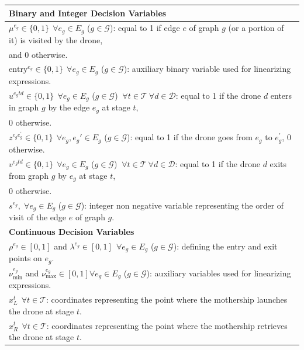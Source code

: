 \begin{table}[h!]
\scriptsize
\centering
\begin{tabular}{|l|}
\hline 
\textbf{Binary and Integer Decision Variables}\\
\hline
$\mu^{e_g} \in \{0,1\} \:\: \forall e_g \in E_g$ ($g \in \mathcal{G}$): equal to 1 if edge $e$ of graph $g$ (or a portion of it) is visited by the drone,\\ \hspace*{1cm} and  0 otherwise.\\
$\text{entry}^{e_g} \in \{0,1\} \:\: \forall e_g \in E_g$ ($g \in \mathcal{G}$): auxiliary binary variable used for linearizing expressions.\\
$u^{e_{g}td} \in \{0,1\} \:\: \forall e_g \in E_g$ ($g \in \mathcal{G}$) $\: \forall t \in \mathcal T \: \forall d \in \mathcal D$: equal to 1 if the drone $d$ enters in graph $g$ by the edge $e_g$ at stage $t$,\\ \hspace*{1cm} 0 otherwise.\\
$z^{e_{g}e^{'}_{g}} \in \{0,1\} \:\: \forall e_g, e_g' \in E_g$ ($g \in \mathcal{G}$): equal to 1 if the drone goes from $e_g$ to $e^{'}_{g}$, 0 otherwise.\\
$v^{e_{g}td} \in \{0,1\} \:\: \forall e_g \in E_g$ ($g \in \mathcal{G}$) $\: \forall t \in\mathcal T \: \forall d \in \mathcal D$: equal to 1 if the drone $d$ exits from graph $g$ by $e_g$ at stage $t$,\\ \hspace*{1cm} 0 otherwise.\\
$s^{e_g},\; \forall e_g \in E_g$ ($g \in \mathcal{G}$): integer non negative variable representing the order of visit of the edge $e$ of graph $g$.\\
\hline
\textbf{Continuous Decision Variables}\\
\hline
$\rho^{e_g} \in [0,1]$ and $\lambda^{e_g} \in [0,1] \:\: \forall e_g \in E_g$ ($g \in \mathcal{G}$): defining the entry and exit points on $e_g$.\\
$\nu_\text{min}^{e_g}$ and $\nu_\text{max}^{e_g} \in [0,1] \forall e_g \in E_g$ ($g \in \mathcal{G}$): auxiliary variables used for linearizing expressions.\\
$x_L^t \:\: \forall t \in\mathcal T$: coordinates representing the point where the mothership launches the drone at stage $t$.\\
$x_R^t \:\: \forall t \in\mathcal T$: coordinates representing the point where the mothership retrieves the drone at stage $t$.\\

\end{tabular}
\end{table}
